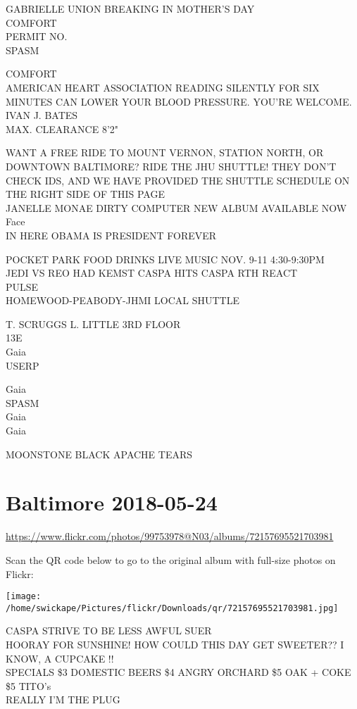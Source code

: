 \documentclass[10pt,letterpaper]{article}
\begin{document}
GABRIELLE UNION BREAKING IN MOTHER'S DAY\\
COMFORT\\
PERMIT NO.\\
SPASM

COMFORT\\
AMERICAN HEART ASSOCIATION READING SILENTLY FOR SIX MINUTES CAN LOWER YOUR BLOOD PRESSURE.  YOU'RE WELCOME.\\
IVAN J. BATES\\
MAX. CLEARANCE 8'2"

WANT A FREE RIDE TO MOUNT VERNON, STATION NORTH, OR DOWNTOWN BALTIMORE?  RIDE THE JHU SHUTTLE!  THEY DON'T CHECK IDS, AND WE HAVE PROVIDED THE SHUTTLE SCHEDULE ON THE RIGHT SIDE OF THIS PAGE\\
JANELLE MONAE DIRTY COMPUTER NEW ALBUM AVAILABLE NOW\\
Face\\
IN HERE OBAMA IS PRESIDENT FOREVER

POCKET PARK FOOD DRINKS LIVE MUSIC NOV. 9{-}11 4:30{-}9:30PM\\
JEDI VS REO HAD KEMST CASPA HITS CASPA RTH REACT\\
PULSE\\
HOMEWOOD{-}PEABODY{-}JHMI LOCAL SHUTTLE

T. SCRUGGS L. LITTLE 3RD FLOOR\\
13E\\
Gaia\\
USERP

Gaia\\
SPASM\\
Gaia\\
Gaia

MOONSTONE BLACK APACHE TEARS


\section*{Baltimore 2018-05-24}

\url{https://www.flickr.com/photos/99753978@N03/albums/72157695521703981}

Scan the QR code below to go to the original album with full-size photos on Flickr:

\texttt{[image: /home/swickape/Pictures/flickr/Downloads/qr/72157695521703981.jpg]}


CASPA STRIVE TO BE LESS AWFUL SUER\\
HOORAY FOR SUNSHINE!  HOW COULD THIS DAY GET SWEETER??  I KNOW, A CUPCAKE !!\\
SPECIALS \$3 DOMESTIC BEERS \$4 ANGRY ORCHARD \$5 OAK + COKE \$5 TITO's\\
REALLY I'M THE PLUG
\end{document}
